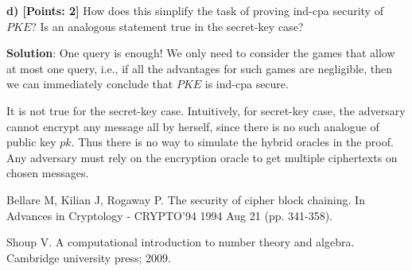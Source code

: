 \documentclass[12pt]{article}
\theoremstyle{definition}
\begin{document}
{\bf d) [Points: 2]} How does this simplify the task of proving ind-cpa security of $PKE$? Is an
analogous statement true in the secret-key case?

{\bf Solution}: One query is enough! We only need to consider the games that allow at most one query, i.e., if all the advantages for such games are negligible, then we can immediately conclude that $PKE$ is ind-cpa secure.

It is not true for the secret-key case. Intuitively, for secret-key case, the adversary cannot encrypt any message all by herself, since there is no such analogue of public key $pk$. Thus there is no way to simulate the hybrid oracles in the proof. Any adversary must rely on the encryption oracle to get multiple ciphertexts on chosen messages.

\begin{thebibliography}{10}
Bellare M, Kilian J, Rogaway P. The security of cipher block chaining. In Advances in Cryptology - CRYPTO’94 1994 Aug 21 (pp. 341-358).

Shoup V. A computational introduction to number theory and algebra. Cambridge university press; 2009.
\end{thebibliography}
\end{document}
